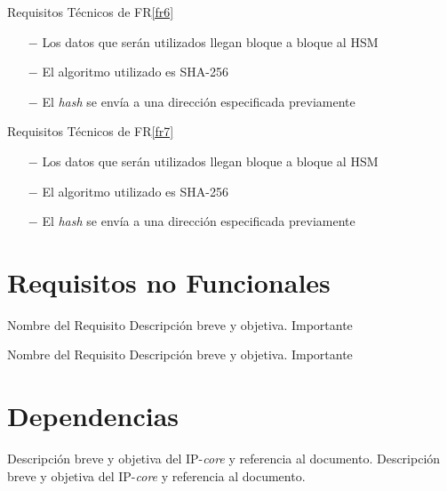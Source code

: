 \documentclass[a4paper]{article}
\begin{document}
\begin{technical}
            \techrequirement
            {Requisitos Técnicos de FR\ref{fr6}}
      {
      \begin{itemize}
        \item[$-$]{Los datos que serán utilizados llegan bloque a bloque al HSM}
        \item[$-$]{El algoritmo utilizado es SHA-256}
                \item[$-$]{El \textit{hash} se envía a una dirección especificada previamente}
      \end{itemize}
      }
            
            \techrequirement
            {Requisitos Técnicos de FR\ref{fr7}}
      {
      \begin{itemize}
        \item[$-$]{Los datos que serán utilizados llegan bloque a bloque al HSM}
        \item[$-$]{El algoritmo utilizado es SHA-256}
        \item[$-$]{El \textit{hash} se envía a una dirección especificada previamente}
      \end{itemize}
      }
    \end{technical}    
 
\section{Requisitos no Funcionales}

  \begin{nonfunctional}
    {Nombre del Requisito}
    {Descripción breve y objetiva.}
    {Importante}

    {Nombre del Requisito}
    {Descripción breve y objetiva.}
    {Importante}
  \end{nonfunctional}

\section{Dependencias}

  \begin{dependencies}
        {Descripción breve y objetiva del IP-\textit{core} y referencia al documento.}
        {Descripción breve y objetiva del IP-\textit{core} y referencia al documento.}
  \end{dependencies}  
\end{document}
